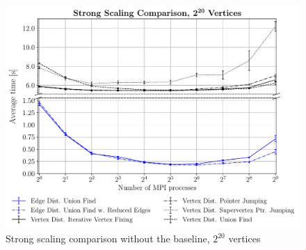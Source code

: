 \documentclass[letterpaper]{article}
\begin{document}

% 

\begin{figure}
  \includegraphics[width=\columnwidth]{../benchmark-results/plots/strongscaling_s20.pdf}
  \caption{Strong scaling comparison without the baseline, $2^{20}$ vertices}
  \label{fig:strongscaling-20}
\end{figure}
\end{document}
